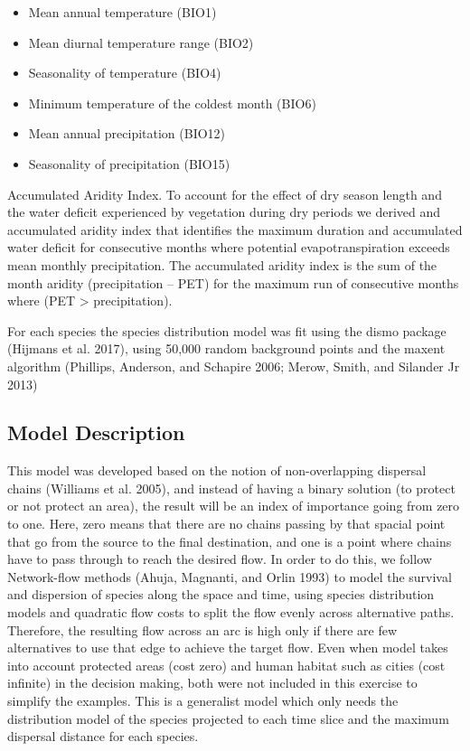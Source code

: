\documentclass[]{article}
\providecommand{\tightlist}{%
  \setlength{\itemsep}{0pt}\setlength{\parskip}{0pt}}
\begin{document}
\begin{itemize}
\tightlist
\item
  Mean annual temperature (BIO1)
\item
  Mean diurnal temperature range (BIO2)
\item
  Seasonality of temperature (BIO4)
\item
  Minimum temperature of the coldest month (BIO6)
\item
  Mean annual precipitation (BIO12)
\item
  Seasonality of precipitation (BIO15)
\end{itemize}

Accumulated Aridity Index. To account for the effect of dry season length and the water deficit experienced by vegetation during dry periods we derived and accumulated aridity index that identifies the maximum duration and accumulated water deficit for consecutive months where potential evapotranspiration exceeds mean monthly precipitation. The accumulated aridity index is the sum of the month aridity (precipitation -- PET) for the maximum run of consecutive months where (PET \textgreater{} precipitation).

For each species the species distribution model was fit using the dismo package (Hijmans et al. 2017), using 50,000 random background points and the maxent algorithm (Phillips, Anderson, and Schapire 2006; Merow, Smith, and Silander Jr 2013)

\hypertarget{model-description}{%
\subsection{Model Description}\label{model-description}}

This model was developed based on the notion of non-overlapping dispersal chains (Williams et al. 2005), and instead of having a binary solution (to protect or not protect an area), the result will be an index of importance going from zero to one. Here, zero means that there are no chains passing by that spacial point that go from the source to the final destination, and one is a point where chains have to pass through to reach the desired flow.
In order to do this, we follow Network-flow methods (Ahuja, Magnanti, and Orlin 1993) to model the survival and dispersion of species along the space and time, using species distribution models and quadratic flow costs to split the flow evenly across alternative paths. Therefore, the resulting flow across an arc is high only if there are few alternatives to use that edge to achieve the target flow.
Even when model takes into account protected areas (cost zero) and human habitat such as cities (cost infinite) in the decision making, both were not included in this exercise to simplify the examples. This is a generalist model which only needs the distribution model of the species projected to each time slice and the maximum dispersal distance for each species.
\end{document}
